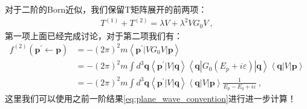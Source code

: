 \bigskip
{}

对于二阶的Born近似，我们保留T矩阵展开的前两项：
\begin{align}
  T^{(1)}+T^{(2)}=\lambda V+\lambda^2VG_0V\mathrm{~,}
\end{align}
第一项上面已经完成讨论，对于第二项我们有：
\begin{align}
  f^{(2)}(\mathbf{p^{\prime}\leftarrow
  p})&=-(2\pi)^2m\left\langle\mathbf{p}^{\prime}|VG_0V|\mathbf{p}\right\rangle\\
  &=-(2\pi)^2m\int
  d^3\mathbf{q}\left\langle\mathbf{p}^{\prime}|V|\mathbf{q}\right\rangle\left\langle\mathbf{q}|G_0(E_p+i\varepsilon)|\mathbf{q}\right\rangle\left\langle\mathbf{q}|V|\mathbf{p}\right\rangle\\
  &=-(2\pi)^2m\int
  d^3\mathbf{q}\left\langle\mathbf{p}^{\prime}|V|\mathbf{q}\right\rangle\left\langle\mathbf{q}|V|\mathbf{p}\right\rangle\frac{1}{E_p-E_q+i\varepsilon}\mathrm{~,}
\end{align}
这里我们可以使用之前一阶结果\cref{eq:plane_wave_convention}进行进一步计算！
